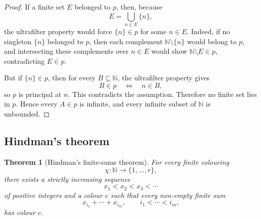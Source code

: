 \documentclass[11pt]{article}
\newtheorem{theorem}{Theorem}[section]
\newcommand{\NN}{\mathbb N}
\begin{document}
\begin{proof}
If a finite set $E$ belonged to $p$, then, because
\[
    E=\bigcup_{n\in E}\{n\},
\]
the ultrafilter property would force $\{n\}\in p$ for some $n\in E$. Indeed, if no singleton $\{n\}$ belonged to $p$, then each complement $\NN\setminus\{n\}$ would belong to $p$, and intersecting these complements over $n\in E$ would show $\NN\setminus E\in p$, contradicting $E\in p$.

But if $\{n\}\in p$, then for every $B\subseteq\NN$, the ultrafilter property gives
\[
    B\in p\quad\Longleftrightarrow\quad n\in B,
\]
so $p$ is principal at $n$. This contradicts the assumption. Therefore no finite set lies in $p$. Hence every $A\in p$ is infinite, and every infinite subset of $\NN$ is unbounded.
\end{proof}

\subsection{Hindman's theorem}

\begin{theorem}[Hindman's finite-sums theorem]\label{thm:hindman}
For every finite colouring
\[
    \chi:\NN\to\{1,\ldots,r\},
\]
there exists a strictly increasing sequence
\[
    x_1<x_2<x_3<\cdots
\]
of positive integers and a colour $c$ such that every non-empty finite sum
\[
    x_{i_1}+\cdots+x_{i_m},\qquad i_1<\cdots<i_m,
\]
has colour $c$.
\end{theorem}
\end{document}
